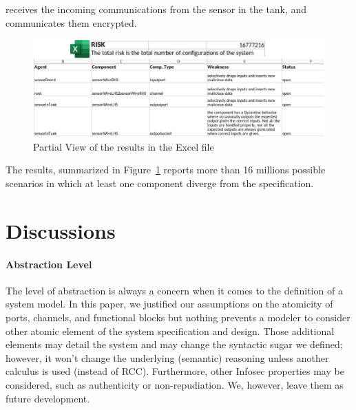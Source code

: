 \documentclass[conference]{IEEEtran}
\begin{document}
receives the incoming communications from the sensor in the tank, and 
communicates them encrypted.
\begin{figure}
	\centering
	\includegraphics[width=\textwidth]{results_excel.pdf}
	\caption{Partial View of the results in the Excel file}
	\label{fig:results}
\end{figure}
The results, summarized in Figure~\ref{fig:results} reports more than 16 millions
possible scenarios in which at least one component diverge from the specification.

\section{Discussions}\label{sec:discussion}
\paragraph{Abstraction Level}
The level of abstraction is always a concern when it comes to the definition of
a system model.  In this paper, we justified our assumptions on the atomicity
of ports, channels, and functional blocks but nothing prevents a modeler to
consider other atomic element of the system specification and design.  Those
additional elements may detail the system and may change the syntactic sugar we
defined; however, it won't change the underlying (semantic) reasoning unless
another calculus is used (instead of RCC).  Furthermore, other Infosec
properties may be considered, such as authenticity or non-repudiation. We,
however, leave them as future development.
\end{document}
